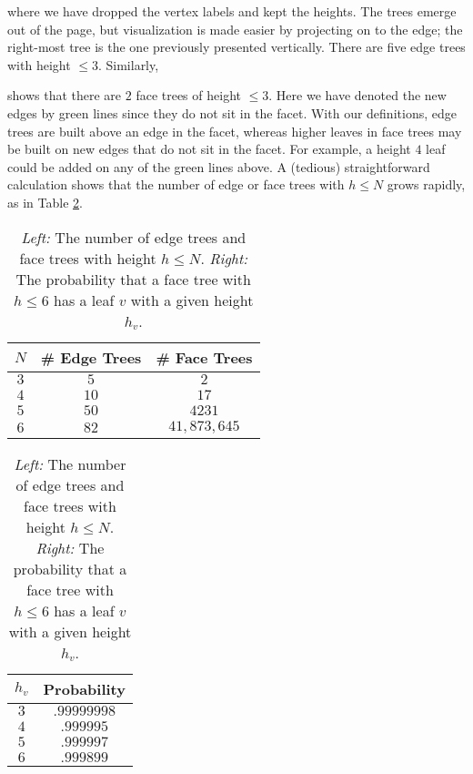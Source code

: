 \documentclass[aps,prl,twocolumn, superscriptaddress,groupedaddress,nofootinbib]{revtex4-1}
\begin{document}
where we have dropped the vertex labels and kept the heights.
The trees emerge out of the page, but visualization is made easier
by projecting on to the edge; the right-most tree is the
one previously presented vertically. There are five
edge trees with height $\leq 3$. Similarly,
\begin{center}
\end{center}
shows that there are $2$ face trees of height $\leq 3$. Here we have denoted the new edges by green lines since they do
not sit in the facet. With our definitions, edge trees are built above an edge
in the facet, whereas higher leaves in face trees may be built on new edges
that do not sit in the facet. For example, a height $4$ leaf could be added
on any of the green lines above. A (tedious) straightforward calculation shows that the number of
edge or face trees with $h \leq N$ grows rapidly, as in
Table \ref{tab:numedgefacetreeandprob}.
\begin{table}
\begin{tabular}{|c|c|c|}
\hline
$N$ & \# Edge Trees & \# Face Trees \\ \hline
$3$ & $5$ & $2$\\
$4$ & $10$ & $17$\\
$5$ & $50$ & $4231$ \\
$6$ & $82$ & $41,873,645$\\ \hline
\end{tabular} \hspace{1cm}
\begin{tabular}{|c|c|}
\hline
$h_v$ & Probability \\ \hline
$3$ & $.99999998$ \\
$4$ & $.999995$ \\
$5$ & $.999997$  \\
$6$ & $.999899$ \\ \hline
\end{tabular}
\caption{\emph{Left:} The number of edge trees and face trees with height $h\leq N$.
\emph{Right:} The probability that a face tree with $h\leq 6$ has a leaf $v$ with
a given height $h_v$.}
\label{tab:numedgefacetreeandprob}
\end{table}
\end{document}
